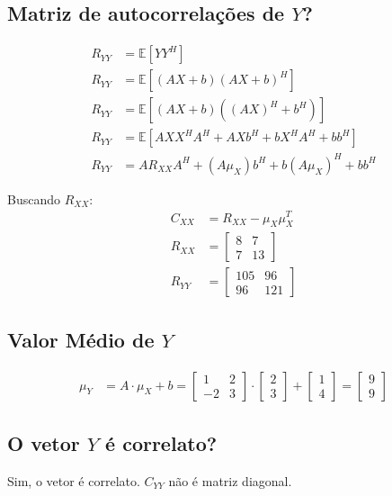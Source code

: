 \documentclass{article}
\begin{document}
\subsection{Matriz de autocorrelações de $Y$?}
\begin{align*}
    R_{YY} &= \mathbb{E}[YY^H] \\
    R_{YY} &= \mathbb{E}[(AX+b)(AX+b)^H] \\
    R_{YY} &= \mathbb{E}[(AX+b)((AX)^H+b^H)] \\
    R_{YY} &= \mathbb{E}[AXX^HA^H + AXb^H + bX^HA^H + bb^H] \\
    R_{YY} &= AR_{XX}A^H + (A\mu_X)b^H + b(A\mu_X)^H + bb^H
\end{align*}

Buscando $R_{XX}$:
\begin{align*}
    C_{XX} &= R_{XX} - \mu_X\mu_X^T \\
    R_{XX} &= \begin{bmatrix} 8&7\\7&13 \end{bmatrix} \\
    R_{YY} &= \begin{bmatrix} 105&96\\96&121 \end{bmatrix}
\end{align*}

\subsection{Valor Médio de $Y$}
\begin{align*}
    \mu_Y &= A \cdot \mu_X + b = \begin{bmatrix} 1 & 2\\-2 & 3 \end{bmatrix} \cdot \begin{bmatrix}
    2\\3 \end{bmatrix}  + \begin{bmatrix} 1\\4 \end{bmatrix} = \begin{bmatrix} 9\\9 \end{bmatrix}
\end{align*}

\subsection{O vetor $Y$ é correlato?}
Sim, o vetor é correlato. $C_{YY}$ não é matriz diagonal.
\end{document}

